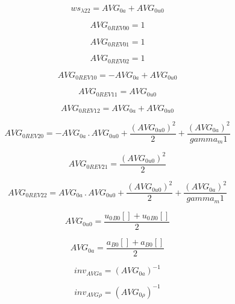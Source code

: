 \documentclass{article}
\begin{document}
\begin{dmath}ws_{\lambda 22} = AVG_{0 a} + AVG_{0 u0}\end{dmath}

\begin{dmath}AVG_{0 REV 00} = 1\end{dmath}

\begin{dmath}AVG_{0 REV 01} = 1\end{dmath}

\begin{dmath}AVG_{0 REV 02} = 1\end{dmath}

\begin{dmath}AVG_{0 REV 10} = - AVG_{0 a} + AVG_{0 u0}\end{dmath}

\begin{dmath}AVG_{0 REV 11} = AVG_{0 u0}\end{dmath}

\begin{dmath}AVG_{0 REV 12} = AVG_{0 a} + AVG_{0 u0}\end{dmath}

\begin{dmath}AVG_{0 REV 20} = - AVG_{0 a} \,.\, AVG_{0 u0} + \frac{\left(AVG_{0 u0} \right)^{2}}{2} + \frac{\left(AVG_{0 a} \right)^{2}}{gamma_m1}\end{dmath}

\begin{dmath}AVG_{0 REV 21} = \frac{\left(AVG_{0 u0} \right)^{2}}{2}\end{dmath}

\begin{dmath}AVG_{0 REV 22} = AVG_{0 a} \,.\, AVG_{0 u0} + \frac{\left(AVG_{0 u0} \right)^{2}}{2} + \frac{\left(AVG_{0 a} \right)^{2}}{gamma_m1}\end{dmath}

\begin{dmath}AVG_{0 u0} = \frac{{u_{0}{_{B0}}}[{}] + {u_{0}{_{B0}}}[{}]}{2}\end{dmath}

\begin{dmath}AVG_{0 a} = \frac{{a{_{B0}}}[{}] + {a{_{B0}}}[{}]}{2}\end{dmath}

\begin{dmath}inv_{AVG a} = \left(AVG_{0 a} \right)^{-1}\end{dmath}

\begin{dmath}inv_{AVG \rho} = \left(AVG_{0 \rho} \right)^{-1}\end{dmath}
\end{document}
